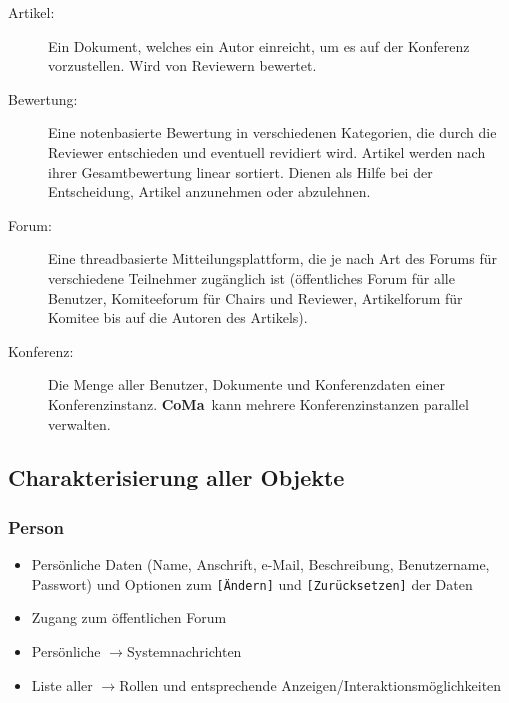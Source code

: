 \documentclass[headexclude,footexclude,12pt,BCOR0pt,DIV15]{scrartcl}
\newcommand{\CoMa}{\textbf{CoMa}}
\begin{document}
        \begin{description}
            \item[Artikel:] Ein Dokument, welches ein Autor einreicht, um es auf der Konferenz
                vorzustellen. Wird von Reviewern bewertet.

            \item[Bewertung:] Eine notenbasierte Bewertung in verschiedenen Kategorien, die durch die Reviewer
                entschieden und eventuell revidiert wird. Artikel werden nach ihrer Gesamtbewertung
                linear sortiert. Dienen als Hilfe bei der Entscheidung, Artikel anzunehmen oder abzulehnen.

            \item[Forum:] Eine threadbasierte Mitteilungsplattform, die je nach Art des Forums f\"{u}r
                          verschiedene Teilnehmer zug\"{a}nglich ist (\"{o}ffentliches Forum f\"{u}r alle Benutzer,
                          Komiteeforum f\"{u}r Chairs und Reviewer, Artikelforum f\"{u}r Komitee bis auf
                          die Autoren des Artikels).

            \item[Konferenz:] Die Menge aller Benutzer, Dokumente und Konferenzdaten einer Konferenzinstanz.
                              \CoMa\ kann mehrere Konferenzinstanzen parallel verwalten.

        \end{description}

    \subsection{Charakterisierung aller Objekte}

        \subsubsection{Person}
        \begin{itemize}
            \item Pers\"{o}nliche Daten (Name, Anschrift, e-Mail, Beschreibung, Benutzername,
                  Passwort) und Optionen zum \texttt{[\"{A}ndern]} und \texttt{[Zur\"{u}cksetzen]} der Daten
            \item Zugang zum \"{o}ffentlichen Forum
            \item Pers\"{o}nliche $\rightarrow$Systemnachrichten
            \item Liste aller $\rightarrow$Rollen und entsprechende Anzeigen/Interaktionsm\"{o}glichkeiten
        \end{itemize}
\end{document}
